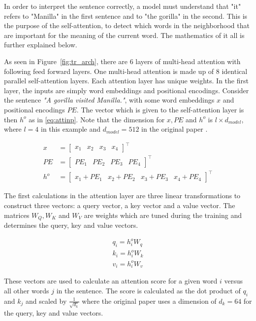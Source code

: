 In order to interpret the sentence correctly, a model must understand that "it" refers to "Manilla" in the first sentence and to "the gorilla" in the second. This is the purpose of the self-attention, to detect which words in the neighborhood that are important for the meaning of the current word. The mathematics of it all is further explained below. 

As seen in Figure~\ref{fig:tr_arch}, there are 6 layers of multi-head attention with following feed forward layers. One multi-head attention is made up of 8 identical parallel self-attention layers. Each attention layer has unique weights. In the first layer, the inputs are simply word embeddings and positional encodings. Consider the sentence \textit{"A gorilla visited Manilla."}, with some word embeddings $x$ and positional encodings $PE$. The vector which is given to the self-attention layer is then $h^o$ as in \ref{eq:attinp}. Note that the dimension for $x, PE$ and $h^o$ is $l \times d_{model}$, where $l = 4$ in this example and $d_{model} = 512$ in the original paper \citep{NIPS2017_7181}. 

\begin{align}
    x &= \begin{bmatrix} x_1 & x_2 & x_3 & x_4 \end{bmatrix}^\intercal \\
    PE &= \begin{bmatrix} PE_1 & PE_2 & PE_3 & PE_4
    \end{bmatrix}^\intercal \\
    h^o &= \begin{bmatrix} x_1 + PE_1 & x_2 + PE_2 & x_3 + PE_3 & x_4 + PE_4 \end{bmatrix}^\intercal \label{eq:attinp}
\end{align}

The first calculations in the attention layer are three linear transformations to construct three vectors: a query vector, a key vector and a value vector. The matrices $W_Q, W_K$ and $W_V$ are weights which are tuned during the training and determines the query, key and value vectors. 

\begin{align}
    q_i = h_i^o W_q \\
    k_i = h_i^o W_k \\
    v_i = h_i^o W_v 
\end{align}

These vectors are used to calculate an attention score for a given word $i$ versus all other words $j$ in the sentence. The score is calculated as the dot product of $q_i$ and $k_j$ and scaled by $\displaystyle{\frac{1}{\sqrt{d_k}}}$ where the original paper uses a dimension of $d_k=64$ for the query, key and value vectors.

